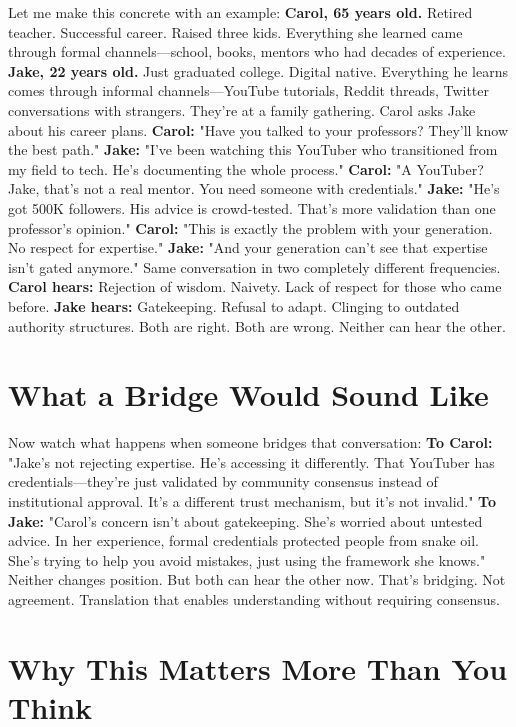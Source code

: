 \documentclass[12pt,openany]{book}
\begin{document}
Let me make this concrete with an example:
\textbf{Carol, 65 years old.} Retired teacher. Successful career. Raised three kids. Everything she learned came through formal channels—school, books, mentors who had decades of experience.
\textbf{Jake, 22 years old.} Just graduated college. Digital native. Everything he learns comes through informal channels—YouTube tutorials, Reddit threads, Twitter conversations with strangers.
They're at a family gathering. Carol asks Jake about his career plans.
\textbf{Carol:} "Have you talked to your professors? They'll know the best path."
\textbf{Jake:} "I've been watching this YouTuber who transitioned from my field to tech. He's documenting the whole process."
\textbf{Carol:} "A YouTuber? Jake, that's not a real mentor. You need someone with credentials."
\textbf{Jake:} "He's got 500K followers. His advice is crowd-tested. That's more validation than one professor's opinion."
\textbf{Carol:} "This is exactly the problem with your generation. No respect for expertise."
\textbf{Jake:} "And your generation can't see that expertise isn't gated anymore."
Same conversation in two completely different frequencies.
\textbf{Carol hears:} Rejection of wisdom. Naivety. Lack of respect for those who came before.
\textbf{Jake hears:} Gatekeeping. Refusal to adapt. Clinging to outdated authority structures.
Both are right. Both are wrong. Neither can hear the other.

\section{What a Bridge Would Sound Like}

Now watch what happens when someone bridges that conversation:
\textbf{To Carol:} "Jake's not rejecting expertise. He's accessing it differently. That YouTuber has credentials—they're just validated by community consensus instead of institutional approval. It's a different trust mechanism, but it's not invalid."
\textbf{To Jake:} "Carol's concern isn't about gatekeeping. She's worried about untested advice. In her experience, formal credentials protected people from snake oil. She's trying to help you avoid mistakes, just using the framework she knows."
Neither changes position. But both can hear the other now.
That's bridging. Not agreement. Translation that enables understanding without requiring consensus.

\section{Why This Matters More Than You Think}
\end{document}
